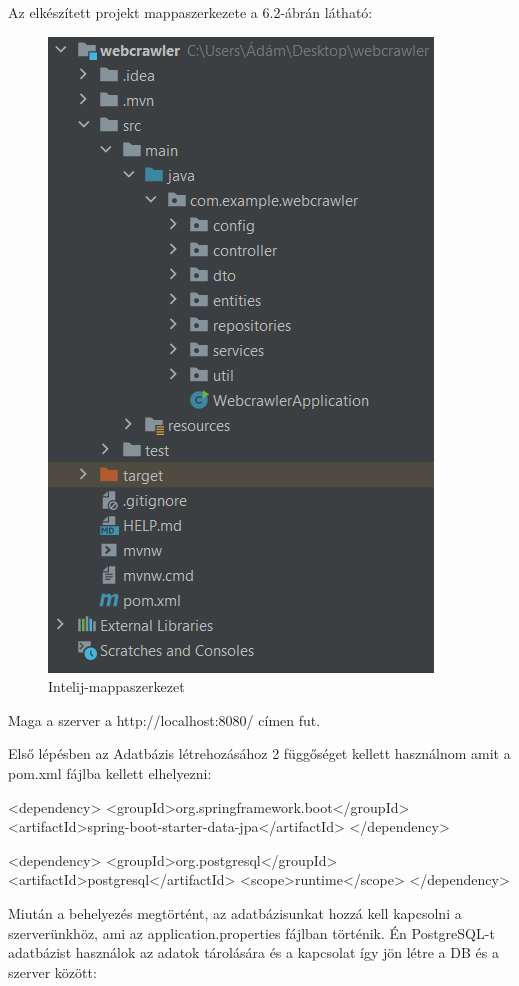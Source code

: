 Az elkészített projekt mappaszerkezete a 6.2-ábrán látható:
\begin{figure}[h]
\centering
\includegraphics[scale=0.7]{images/Intelij-mappaszerkezet.png}
\caption{Intelij-mappaszerkezet}
\label{fig:Intelij-mappaszerkezet}
\end{figure}

Maga a szerver a http://localhost:8080/ címen fut.


Első lépésben az Adatbázis létrehozásához 2 függőséget kellett használnom amit a pom.xml fájlba kellett elhelyezni:
\begin{java}
<dependency>
	<groupId>org.springframework.boot</groupId>
	<artifactId>spring-boot-starter-data-jpa</artifactId>
</dependency>

<dependency>
	<groupId>org.postgresql</groupId>
	<artifactId>postgresql</artifactId>
	<scope>runtime</scope>
</dependency>
\end{java}

Miután a behelyezés megtörtént, az adatbázisunkat hozzá kell kapcsolni a szerverünkhöz, ami az application.properties fájlban történik. Én PostgreSQL-t adatbázist használok az adatok tárolására és a kapcsolat így jön létre a DB és a szerver között:

